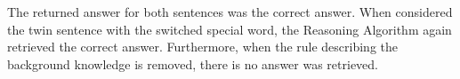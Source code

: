 The returned answer for both sentences was the correct answer. When considered the twin sentence with the switched special word, the Reasoning Algorithm again retrieved the correct answer. Furthermore, when the rule describing the background knowledge is removed, there is no answer was retrieved. 









